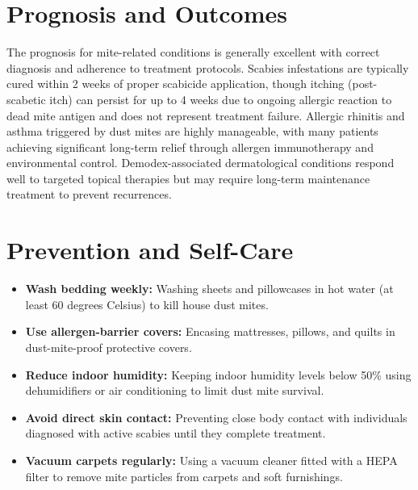 \section*{Prognosis and Outcomes}
The prognosis for mite-related conditions is generally excellent with correct diagnosis and adherence to treatment protocols. Scabies infestations are typically cured within 2 weeks of proper scabicide application, though itching (post-scabetic itch) can persist for up to 4 weeks due to ongoing allergic reaction to dead mite antigen and does not represent treatment failure. Allergic rhinitis and asthma triggered by dust mites are highly manageable, with many patients achieving significant long-term relief through allergen immunotherapy and environmental control. Demodex-associated dermatological conditions respond well to targeted topical therapies but may require long-term maintenance treatment to prevent recurrences.

\section*{Prevention and Self-Care}
\begin{itemize}
    \item \textbf{Wash bedding weekly:} Washing sheets and pillowcases in hot water (at least 60 degrees Celsius) to kill house dust mites.
    \item \textbf{Use allergen-barrier covers:} Encasing mattresses, pillows, and quilts in dust-mite-proof protective covers.
    \item \textbf{Reduce indoor humidity:} Keeping indoor humidity levels below 50\% using dehumidifiers or air conditioning to limit dust mite survival.
    \item \textbf{Avoid direct skin contact:} Preventing close body contact with individuals diagnosed with active scabies until they complete treatment.
    \item \textbf{Vacuum carpets regularly:} Using a vacuum cleaner fitted with a HEPA filter to remove mite particles from carpets and soft furnishings.
\end{itemize}

